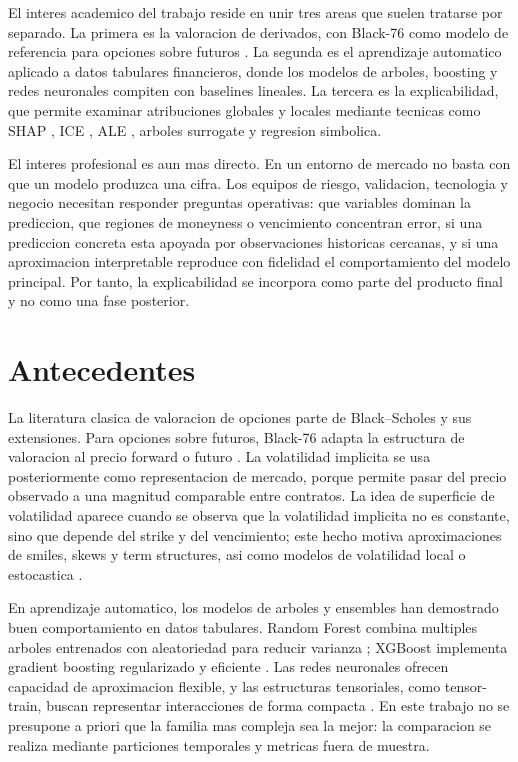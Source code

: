 El interes academico del trabajo reside en unir tres areas que suelen tratarse por separado. La primera es la valoracion de derivados, con Black-76 como modelo de referencia para opciones sobre futuros \citep{black1976pricing}. La segunda es el aprendizaje automatico aplicado a datos tabulares financieros, donde los modelos de arboles, boosting y redes neuronales compiten con baselines lineales. La tercera es la explicabilidad, que permite examinar atribuciones globales y locales mediante tecnicas como SHAP \citep{lundberg2017shap}, ICE \citep{goldstein2015ice}, ALE \citep{apley2020ale}, arboles surrogate y regresion simbolica.

El interes profesional es aun mas directo. En un entorno de mercado no basta con que un modelo produzca una cifra. Los equipos de riesgo, validacion, tecnologia y negocio necesitan responder preguntas operativas: que variables dominan la prediccion, que regiones de moneyness o vencimiento concentran error, si una prediccion concreta esta apoyada por observaciones historicas cercanas, y si una aproximacion interpretable reproduce con fidelidad el comportamiento del modelo principal. Por tanto, la explicabilidad se incorpora como parte del producto final y no como una fase posterior.

\section{Antecedentes}

La literatura clasica de valoracion de opciones parte de Black--Scholes y sus extensiones. Para opciones sobre futuros, Black-76 adapta la estructura de valoracion al precio forward o futuro \citep{black1976pricing}. La volatilidad implicita se usa posteriormente como representacion de mercado, porque permite pasar del precio observado a una magnitud comparable entre contratos. La idea de superficie de volatilidad aparece cuando se observa que la volatilidad implicita no es constante, sino que depende del strike y del vencimiento; este hecho motiva aproximaciones de smiles, skews y term structures, asi como modelos de volatilidad local o estocastica \citep{dupire1994pricing,hull2018options,bergomi2016stochastic}.

En aprendizaje automatico, los modelos de arboles y ensembles han demostrado buen comportamiento en datos tabulares. Random Forest combina multiples arboles entrenados con aleatoriedad para reducir varianza \citep{breiman2001random}; XGBoost implementa gradient boosting regularizado y eficiente \citep{chen2016xgboost}. Las redes neuronales ofrecen capacidad de aproximacion flexible, y las estructuras tensoriales, como tensor-train, buscan representar interacciones de forma compacta \citep{oseledets2011tensor}. En este trabajo no se presupone a priori que la familia mas compleja sea la mejor: la comparacion se realiza mediante particiones temporales y metricas fuera de muestra.

